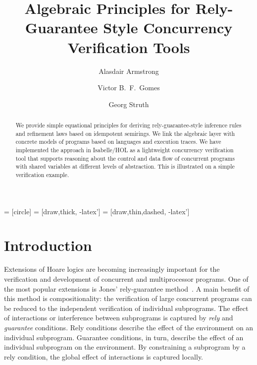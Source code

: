 \documentclass{llncs}
\begin{document}
 = [circle]
 = [draw,thick, -latex']
 = [draw,thin,dashed, -latex']

\title{Algebraic Principles for Rely-Guarantee Style Concurrency Verification Tools}

\author{Alasdair Armstrong \and Victor B.~F.~Gomes \and Georg Struth}


\maketitle

\begin{abstract}
  We provide simple equational principles for deriving
  rely-guarantee-style inference rules and refinement laws based on
  idempotent semirings. We link the algebraic layer with concrete
  models of programs based on languages and execution traces. We have
  implemented the approach in Isabelle/HOL as a lightweight
  concurrency verification tool that supports reasoning about the
  control and data flow of concurrent programs with shared variables
  at different levels of abstraction. This is illustrated on a simple
  verification example.
\end{abstract}

\pagestyle{plain}

\section{Introduction}

Extensions of Hoare logics are becoming increasingly important for the
verification and development of concurrent and multiprocessor
programs. One of the most popular extensions is Jones' rely-guarantee
method~\cite{jones_development_1981}.  A main benefit of this method is
compositionality: the verification of large concurrent programs can be
reduced to the independent verification of individual subprograms. The
effect of interactions or interference between subprograms is captured
by \emph{rely} and \emph{guarantee} conditions. Rely conditions describe
the effect of the environment on an individual subprogram. Guarantee conditions,
in turn, describe the effect of an individual subprogram on the
environment. By constraining a subprogram by a rely condition, the global
effect of interactions is captured locally.
\end{document}
